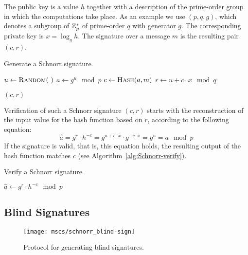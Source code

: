 The public key is a value $h$ together with a description of the prime-order
group in which the computations take place. As an example we use $(p, q, g)$,
which denotes a subgroup of $\mathbb{Z}^*_p$ of prime-order $q$ with generator $g$. The
corresponding private key is $x = \log_g h$. The signature over a message $m$
is the resulting pair $(c, r)$.

\begin{algorithm}
  \caption{Generate a Schnorr signature.}
  \label{alg:Schnorr-sign}
  \addtolength{\baselineskip}{1mm}
  \begin{algorithmic}[1]
      \State $u \gets \Call{Random}{~}$
      \State $a \gets g^u \mod p$
      \State $c \gets \Call{Hash}{a, m}$
      \State $r \gets u + c \cdot x \mod q$

      \Return $(c, r)$
    \EndFunction
  \end{algorithmic}
\end{algorithm}

Verification of such a Schnorr signature $(c, r)$ starts with the reconstruction
of the input value for the hash function based on $r$, according to the
following equation:
\begin{equation}\label{eqn:Schnorr-verify}
  \hat{a} = g^r \cdot h^{-c} = g^{u + c \cdot x} \cdot g^{-c \cdot x} = g^u = a \mod p
\end{equation}
If the signature is valid, that is, this equation holds, the resulting output of
the hash function matches $c$ (see Algorithm~\ref{alg:Schnorr-verify}).

\begin{algorithm}
  \caption{Verify a Schnorr signature.}
  \label{alg:Schnorr-verify}
  \addtolength{\baselineskip}{1mm}
  \begin{algorithmic}[1]
      \State $\hat{a} \gets g^r \cdot h^{-c} \mod p$

        \Return {}
      \EndIf

      \Return {}
    \EndFunction
  \end{algorithmic}
\end{algorithm}

\subsection{Blind Signatures}

\begin{figure}[ht]
  \centering
  \texttt{[image: mscs/schnorr\_blind-sign]}
  \caption{Protocol for generating blind signatures.}
  \label{msc:schnorr_blind-sign}
\end{figure}

